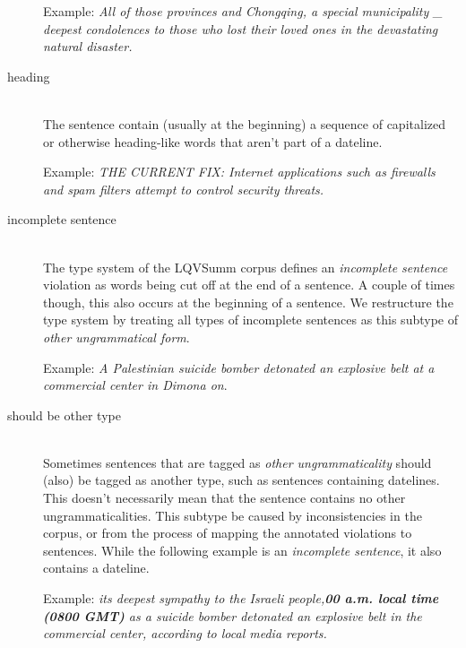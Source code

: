 \documentclass[a4paper,10pt]{scrartcl}
\theoremstyle{style}
\begin{document}
\begin{description}
	Example: \textit{All of those provinces and Chongqing, a special municipality \_ deepest condolences to those who lost their loved ones in the devastating natural disaster.}

\item[heading] \hfill \\
	The sentence contain (usually at the beginning) a sequence of capitalized or otherwise heading-like words that aren't part of a dateline.

	Example: \textit{THE CURRENT FIX: Internet applications such as firewalls and spam filters attempt to control security threats.}

\item[incomplete sentence] \hfill \\
	The type system of the LQVSumm corpus \citep{friedrichlqvsumm} defines an \textit{incomplete sentence} violation as words being cut off at the end of a sentence. A couple of times though, this also occurs at the beginning of a sentence. We restructure the type system by treating all types of incomplete sentences as this subtype of \textit{other ungrammatical form}.

	Example: \textit{A Palestinian suicide bomber detonated an explosive belt at a \\commercial center in Dimona on}.
\item[should be other type] \hfill \\
	Sometimes sentences that are tagged as \textit{other ungrammaticality} should (also) be tagged as another type, such as sentences containing datelines. This doesn't necessarily mean that the sentence contains no other ungrammaticalities. This subtype be caused by inconsistencies in the corpus, or from the process of mapping the annotated violations to sentences. While the following example is an \textit{incomplete sentence}, it also contains a dateline.

	Example: \textit{its deepest sympathy to the Israeli people,\textbf{00 a.m. local time (0800 GMT)} as a suicide bomber detonated an explosive belt in the commercial center, according to local media reports.}
%


\end{description}
\end{document}
